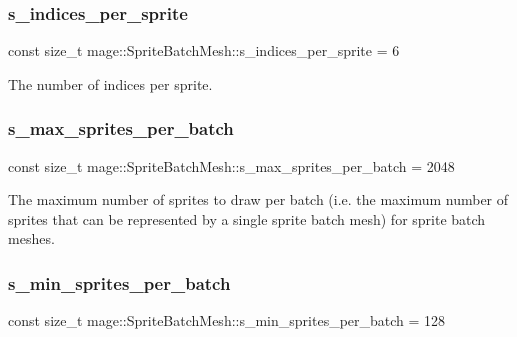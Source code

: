 \subsubsection{\texorpdfstring{s\+\_\+indices\+\_\+per\+\_\+sprite}{s\_indices\_per\_sprite}}
{\footnotesize\ttfamily const size\+\_\+t mage\+::\+Sprite\+Batch\+Mesh\+::s\+\_\+indices\+\_\+per\+\_\+sprite = 6\hspace{0.3cm}{\ttfamily [static]}}

The number of indices per sprite. \hypertarget{classmage_1_1_sprite_batch_mesh_aa4c18beb1d7355a184ac3c93c6a254e3}{}\label{classmage_1_1_sprite_batch_mesh_aa4c18beb1d7355a184ac3c93c6a254e3} 
\subsubsection{\texorpdfstring{s\+\_\+max\+\_\+sprites\+\_\+per\+\_\+batch}{s\_max\_sprites\_per\_batch}}
{\footnotesize\ttfamily const size\+\_\+t mage\+::\+Sprite\+Batch\+Mesh\+::s\+\_\+max\+\_\+sprites\+\_\+per\+\_\+batch = 2048\hspace{0.3cm}{\ttfamily [static]}}

The maximum number of sprites to draw per batch (i.\+e. the maximum number of sprites that can be represented by a single sprite batch mesh) for sprite batch meshes. \hypertarget{classmage_1_1_sprite_batch_mesh_accc52fa93a3c7d42e2d4db54c1211d5d}{}\label{classmage_1_1_sprite_batch_mesh_accc52fa93a3c7d42e2d4db54c1211d5d} 
\subsubsection{\texorpdfstring{s\+\_\+min\+\_\+sprites\+\_\+per\+\_\+batch}{s\_min\_sprites\_per\_batch}}
{\footnotesize\ttfamily const size\+\_\+t mage\+::\+Sprite\+Batch\+Mesh\+::s\+\_\+min\+\_\+sprites\+\_\+per\+\_\+batch = 128\hspace{0.3cm}{\ttfamily [static]}}

